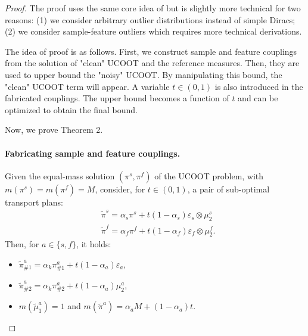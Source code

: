   \begin{proof}
    The proof uses the same core idea of \citep{Fatras21} but is slightly more technical
    for two reasons: (1) we consider arbitrary outlier distributions instead of simple Diracs;
    (2) we consider sample-feature outliers which requires more technical derivations.

    The idea of proof is as follows. First, we construct sample and feature couplings
    from the solution of "clean" UCOOT and the reference measures. Then, they are used to
    upper bound the "noisy" UCOOT. By manipulating this bound, the "clean" UCOOT term will appear.
    A variable $t \in (0,1)$ is also introduced in the fabricated couplings.
    The upper bound becomes a function of $t$ and can be optimized to obtain the final bound.

    Now, we prove Theorem 2.

    \paragraph{Fabricating sample and feature couplings.}
    Given the equal-mass solution $(\pi^s, \pi^f)$ of the UCOOT problem,
    with $m(\pi^s) = m(\pi^f) = M$, consider, for $t \in (0,1)$, a pair of
    sub-optimal transport plans:
    \begin{align}
      &\widetilde{\pi}^s = \alpha_s \pi^s + t (1-\alpha_s) \varepsilon_s \otimes \mu^s_2\\
      &\widetilde{\pi}^f = \alpha_f \pi^f + t (1-\alpha_f) \varepsilon_f \otimes \mu^f_2.
    \end{align}
    Then, for $a\in \{s, f\}$, it holds:
    \begin{itemize}
      \item $\widetilde{\pi}^a_{\#1} = \alpha_k \pi^a_{\#1} + t (1 - \alpha_a) \varepsilon_a$,
      \item $\widetilde{\pi}^a_{\#2} = \alpha_k \pi^a_{\#2} + t (1 - \alpha_a) \mu^a_2$,
      \item $m(\widetilde{\mu}^a_1) = 1$ and $m(\widetilde{\pi}^a) = \alpha_a M + (1-\alpha_a) t$.
    \end{itemize}

\end{proof}
